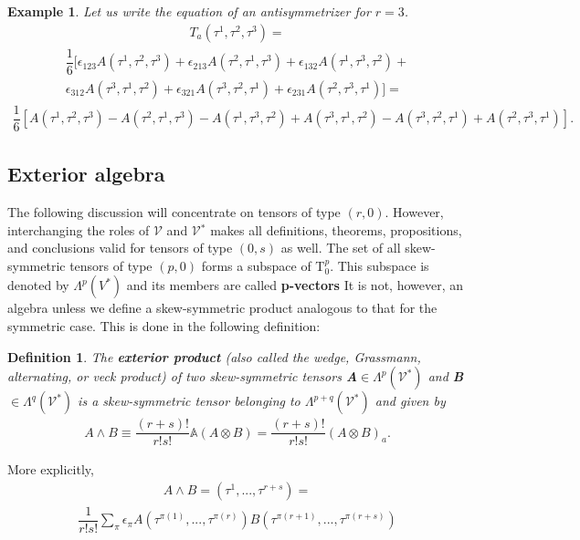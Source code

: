 \documentclass[12pt,a4paper]{article}
\newtheorem{defn}[thm]{Definition}
\newtheorem{exmp}{Example}[section]
\begin{document}
\begin{exmp}
Let us write the equation of an antisymmetrizer for $r = 3$.\\
\begin{align*}
T_a(\tau^1,\tau^2,\tau^3) =
\end{align*}
\begin{align*}
 \dfrac{1}{6} [ \epsilon_{123}A(\tau^1,\tau^2,\tau^3) + \epsilon_{213}A(\tau^2,\tau^1,\tau^3) + \epsilon_{132}A(\tau^1,\tau^3,\tau^2) +\\ \epsilon_{312}A(\tau^3,\tau^1,\tau^2) + \epsilon_{321}A(\tau^3,\tau^2,\tau^1) + \epsilon_{231}A(\tau^2,\tau^3,\tau^1) ] =
 \end{align*}
 \begin{align*}
\dfrac{1}{6} [A(\tau^1,\tau^2,\tau^3)- A(\tau^2,\tau^1,\tau^3)  - A(\tau^1,\tau^3,\tau^2) + A(\tau^3,\tau^1,\tau^2) - A(\tau^3,\tau^2,\tau^1) + A(\tau^2,\tau^3,\tau^1) ].
\end{align*}

\end{exmp}

\subsection{Exterior algebra}
The following discussion will concentrate on tensors of type $(r, 0)$. However, interchanging the roles of $\mathcal{V}$ and $\mathcal{V}$$^*$ makes all definitions, theorems,
propositions, and conclusions valid for tensors of type $(0, s)$ as well. The set of all skew-symmetric tensors of type $(p, 0)$ forms a subspace of T$^{p}_{0}$. This subspace is denoted by $\Lambda^{p}  (V^*)$ and its members are called \textbf{p-vectors} It is not, however, an algebra unless we define a skew-symmetric
product analogous to that for the symmetric case. This is done in the following definition:
\begin{defn}
The \textbf{exterior product} (also called the wedge, Grassmann, alternating, or veck product) of two skew-symmetric tensors \textbf{A}$\in\Lambda^{p}(\mathcal{V}^*)$ and  \textbf{B}$\in\Lambda^{q}(\mathcal{V}^*)$ is a skew-symmetric tensor belonging to $\Lambda^{p+q}(\mathcal{V}^*)$ and given by
\begin{align*}
A \wedge B \equiv \dfrac{(r+s)!}{r!s!} \mathbb{A} (A \otimes B ) =\dfrac{(r+s)!}{r!s!}(A \otimes B ) _{a}.
\end{align*}
\end{defn}

More explicitly,\\
\begin{align*}
A \wedge B = (\tau^1,...,\tau^{r+s})=
\end{align*}
\begin{align*}	
\dfrac{1}{r!s!}\sum_{\pi}\epsilon_{\pi} A (\tau^{\pi(1)},...,\tau^{\pi(r)})B (\tau^{\pi(r+1)},...,\tau^{\pi(r+s)})
\end{align*}
\end{document}
